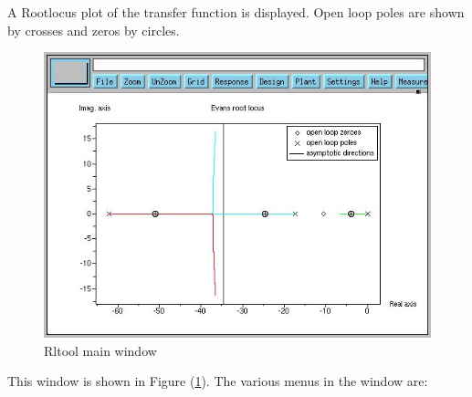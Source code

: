 A Rootlocus plot of the transfer function is displayed. Open loop
poles are shown by crosses and zeros by circles. 
\begin{figure}
\centerline{\includegraphics[width=3 in]{Rlt_main}}
\caption{Rltool main window}
\label{Rlt_main}
\end{figure}
This window is shown in Figure (\ref{Rlt_main}). The various menus in
the window are:
